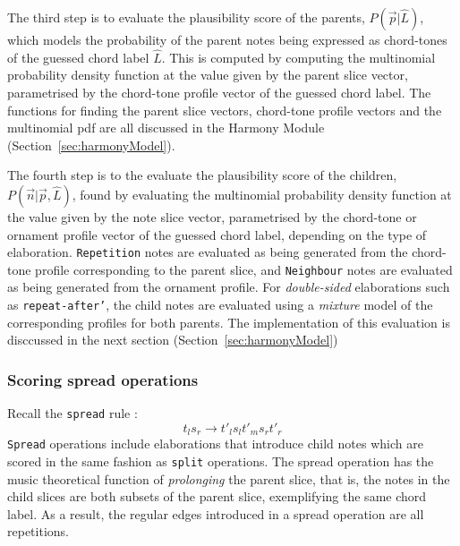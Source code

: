 \documentclass[12pt,a4paper,twoside,openany]{report} \usepackage[pdfborder={0 0 0}]{hyperref}    %
\theoremstyle{definition} \newtheorem{definition}{Definition}[section]
\begin{document}
    The third step is to evaluate the plausibility score of the parents, $P(\vec{p} | \hat{L})$, which models the
    probability of the parent notes being expressed as chord-tones of the guessed chord label $\hat{L}$. 
    This is computed by computing the multinomial probability density function at the value given by the parent slice vector,
    parametrised by the chord-tone profile vector of the guessed chord label. The functions for finding the parent slice
    vectors, chord-tone profile vectors and the multinomial pdf are all discussed in the Harmony Module
    (Section~\ref{sec:harmonyModel}).

    The fourth step is to the evaluate the plausibility score of the children, $P(\vec{n}| \vec{p} , \hat{L})$, found by
    evaluating the multinomial probability density function at the value given by the note slice vector,
    parametrised by the chord-tone or ornament profile vector of the guessed chord label, depending on the type of
    elaboration. \texttt{Repetition} notes are evaluated as being generated from the chord-tone profile corresponding to the parent
    slice, and \texttt{Neighbour} notes are evaluated as being generated from the ornament profile. For
    \textit{double-sided} elaborations such as \texttt{repeat-after'}, the child notes are evaluated using
    a \textit{mixture} model of the corresponding profiles for both parents. The implementation of this evaluation is
    disccussed in the next section (Section~\ref{sec:harmonyModel})

    \subsubsection{Scoring spread operations}
    Recall the \texttt{spread} rule : \[t_l s_r \to t'_l s_l t'_m s_r t'_r\] 
    \texttt{Spread} operations include elaborations that introduce child notes which are scored in the same
    fashion as \texttt{split} operations. The spread operation has the music theoretical function of \textit{prolonging} the parent slice, that is, the
    notes in the child slices are both subsets of the parent slice, exemplifying the same chord label. As a result,
    the regular edges introduced in a spread operation are all repetitions.

\end{document}
